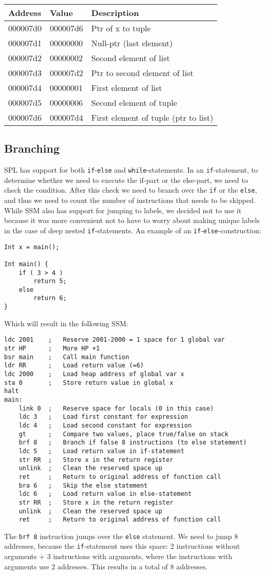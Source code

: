 \documentclass[a4paper]{article}
\begin{document}
\begin{tabular}{|l|l|l|}
	\hline
	Address & Value & Description \\
	\hline
	000007d0 & 000007d6 & Ptr of x to tuple \\
	000007d1 & 00000000 & Null-ptr (last element) \\
	000007d2 & 00000002 & Second element of list \\
	000007d3 & 000007d2 & Ptr to second element of list \\
	000007d4 & 00000001 & First element of list \\
	000007d5 & 00000006 & Second element of tuple \\
	000007d6 & 000007d4 & First element of tuple (ptr to list) \\
	\hline
\end{tabular}

\subsection{Branching}
SPL has support for both {\tt if}-{\tt else} and {\tt while}-statements. In an {\tt if}-statement, to determine whether we need to execute the if-part or the else-part, we need to check the condition. After this check we need to branch over the {\tt if} or the {\tt else}, and thus we need to count the number of instructions that needs to be skipped. While SSM also has support for jumping to labels, we decided not to use it because it was more convenient not to have to worry about making unique labels in the case of deep nested {\tt if}-statements. An example of an {\tt if}-{\tt else}-construction:

\begin{lstlisting}
Int x = main();

Int main() {
	if ( 3 > 4 )
		return 5;
	else
		return 6;
}	
\end{lstlisting}
Which will result in the following SSM:
\begin{lstlisting}
ldc 2001	;	Reserve 2001-2000 = 1 space for 1 global var
str HP		;	More HP +1
bsr main	;	Call main function
ldr RR		;	Load return value (=6)
ldc 2000	;	Load heap address of global var x
sta 0		;	Store return value in global x
halt
main:		
	link 0	;	Reserve space for locals (0 in this case)
	ldc 3	;	Load first constant for expression
	ldc 4	;	Load second constant for expression
	gt		;	Compare two values, place true/false on stack
	brf 8	;	Branch if false 8 instructions (to else statement)
	ldc 5	;	Load return value in if-statement
	str RR	;	Store x in the return register
	unlink	;	Clean the reserved space up
	ret		;	Return to original address of function call
	bra 6	;	Skip the else statement
	ldc 6	;	Load return value in else-statement
	str RR	;	Store x in the return register
	unlink	;	Clean the reserved space up
	ret		;	Return to original address of function call
\end{lstlisting}
The {\tt brf 8} instruction jumps over the {\tt else} statement. We need to jump 8 addresses, because the {\tt if}-statement uses this space: 2 instructions without arguments + 3 instructions with arguments, where the instructions with arguments use 2 addresses. This results in a total of 8 addresses.
\end{document}
